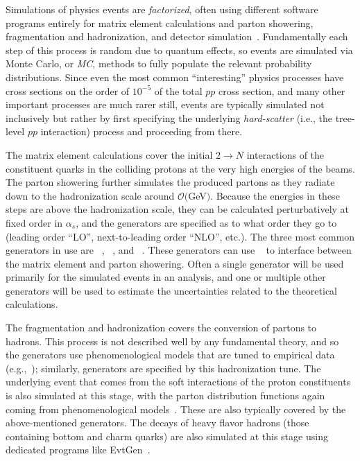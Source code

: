 Simulations of physics events are \textit{factorized}, often using different software programs entirely for matrix element calculations and parton showering, fragmentation and hadronization, and detector simulation~\cite{powhegintro}.
Fundamentally each step of this process is random due to quantum effects, so events are simulated via Monte Carlo, or \textit{MC}, methods to fully populate the relevant probability distributions.
Since even the most common ``interesting'' physics processes have cross sections on the order of $10^{-5}$ of the total $pp$ cross section, and many other important processes are much rarer still, events are typically simulated not inclusively but rather by first specifying the underlying \textit{hard-scatter} (i.e., the tree-level $pp$ interaction) process and proceeding from there.

The matrix element calculations cover the initial $2\rightarrow N$ interactions of the constituent quarks in the colliding protons at the very high energies of the beams.
The parton showering further simulates the produced partons as they radiate down to the hadronization scale around $\mathcal{O}($GeV$)$.
Because the energies in these steps are above the hadronization scale, they can be calculated perturbatively at fixed order in $\alpha_s$, and the generators are specified as to what order they go to (leading order ``LO'', next-to-leading order ``NLO'', etc.).
The three most common generators in use are \PYTHIA~\cite{Sjostrand:2007gs,Sjostrand:2014zea}, \SHERPA~\cite{Gleisberg:2008ta}, and \HERWIG~\cite{Bahr:2008pv,Bellm:2015jjp}.
These generators can use \POWHEGBOX~\cite{Frixione:2007vw,Alioli:2010xd} to interface between the matrix element and parton showering.
Often a single generator will be used primarily for the simulated events in an analysis, and one or multiple other generators will be used to estimate the uncertainties related to the theoretical calculations.

The fragmentation and hadronization covers the conversion of partons to hadrons.
This process is not described well by any fundamental theory, and so the generators use phenomenological models that are tuned to empirical data (e.g.,~\cite{ATL-PHYS-PUB-2014-021}); similarly, generators are specified by this hadronization tune.
The underlying event that comes from the soft interactions of the proton constituents is also simulated at this stage, with the parton distribution functions again coming from phenomenological models~\cite{Lai:2010vv}.
These are also typically covered by the above-mentioned generators.
The decays of heavy flavor hadrons (those containing bottom and charm quarks) are also simulated at this stage using dedicated programs like EvtGen~\cite{Lange:2001uf}.

